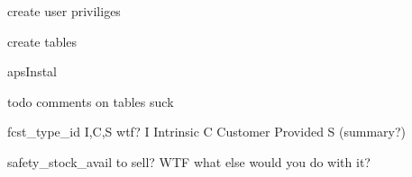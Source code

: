 create user
  priviliges

create tables

	apsInstal


todo comments on tables suck

	fcst_type_id I,C,S wtf?
	I Intrinsic
	C Customer Provided
	S (summary?)

safety_stock_avail to sell?   WTF what else would you do with it?